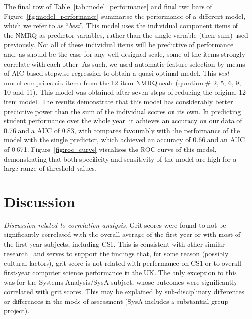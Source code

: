 \documentclass[sigconf]{acmart}
\begin{document}
The final row of Table~\ref{tab:model_performance} and final two bars of Figure~\ref{fig:model_performance} summarise the performance of a different model, which we refer to as ``{\em best}''. This model uses the individual component items of the NMRQ as predictor variables, rather than the single variable (their sum) used previously. Not all of these individual items will be predictive of performance and, as should be the case for any well-designed scale, some of the items strongly correlate with each other. As such, we used  automatic feature selection by means of AIC-based stepwise regression to obtain a quasi-optimal model. This {\em best} model comprises six items from the 12-item NMRQ scale (question \# 2, 5, 6, 9, 10 and 11). This model was obtained after seven steps of reducing the original 12-item model. The results demonstrate that this model has considerably better predictive power than the sum of the individual scores on its own. In predicting student performance over the whole year, it achieves an accuracy on our data of 0.76 and a AUC of 0.83, with compares favourably with the performance of the model with the single predictor, which achieved an accuracy of 0.66 and an AUC of 0.671. Figure~\ref{fig:roc_curve} visualises the ROC curve of this model, demonstrating that both specificity and sensitivity of the model are high for a large range of threshold values.

\section{Discussion}
{\em Discussion related to correlation analysis. }
Grit scores were found to not be significantly correlated with the overall average of the first-year or with most of the first-year subjects, including CS1. This is consistent with other similar research~\cite{Sigurdson:2018:EGC:3279720.3279743} and serves to support the findings that, for some reason (possibly cultural factors), grit score is not related with performance on CS1 or to overall first-year computer science performance in the UK. The only exception to this was for the Systems Analysis/SysA subject, whose outcomes were significantly correlated with grit scores. This may be explained by sub-disciplinary differences or differences in the mode of assessment (SysA includes a substantial group project). 
\end{document}
